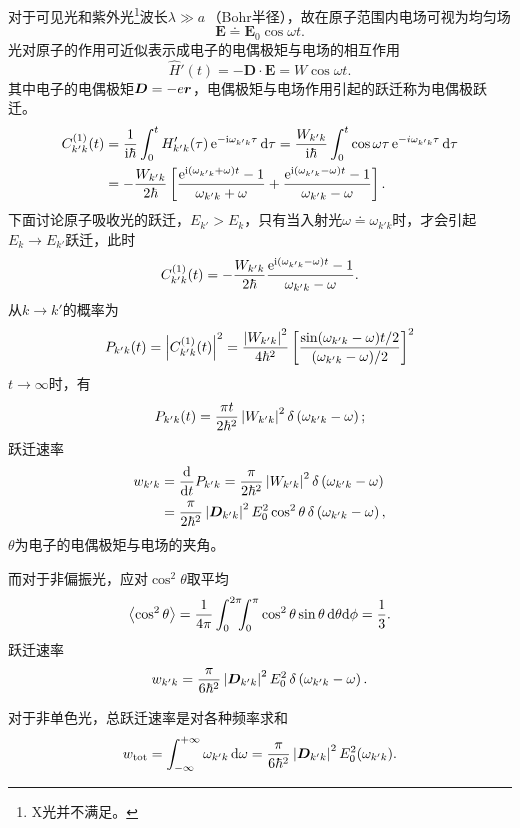 对于可见光和紫外光\footnote{X光并不满足。}波长$\lambda\gg a$\,（Bohr半径），故在原子范围内电场可视为均匀场
\[
	\bm E\doteq\bm E_0\cos\omega t.
\]
光对原子的作用可近似表示成电子的电偶极矩与电场的相互作用
\[
	\hat H'(t)=-\bm D\cdot\bm E=W\cos\omega t.
\]
其中电子的电偶极矩$\bm D=-e\r$，电偶极矩与电场作用引起的跃迁称为电偶极跃迁。
\begin{align*}
	C_{k'k}^{(1)}(t)&=\frac1{\i\hbar}\int_0^tH_{k'k}'(\tau)\e{-\i\omega_{k'k}\tau}\d\tau=\frac{W_{k'k}}{\i\hbar}\int_0^t\cos\omega\tau\e{-i\omega_{k'k}\tau}\d\tau\\
	&=-\frac{W_{k'k}}{2\hbar}\fkh{\frac{\e{\i(\omega_{k'k}+\omega)t}-1}{\omega_{k'k}+\omega}+\frac{\e{\i(\omega_{k'k}-\omega)t}-1}{\omega_{k'k}-\omega}}.
\end{align*}
下面讨论原子吸收光的跃迁，$E_{k'}>E_k$，只有当入射光$\omega\doteq\omega_{k'k}$时，才会引起$E_k\to E_{k'}$跃迁，此时
\begin{align*}
	C_{k'k}^{(1)}(t)=-\frac{W_{k'k}}{2\hbar}\frac{\e{\i(\omega_{k'k}-\omega)t}-1}{\omega_{k'k}-\omega}.
\end{align*}
从$k\to k'$的概率为
\begin{align}
	P_{k'k}(t)=\abs{C_{k'k}^{(1)}(t)}^2=\frac{\abs{W_{k'k}}^2}{4\hbar^2}\fkh{\frac{\sin(\omega_{k'k}-\omega)t/2}{(\omega_{k'k}-\omega)/2}}^2
\end{align}
$t\to\infty$时，有 
\begin{align}
	P_{k'k}(t)=\frac{\pi t}{2\hbar^2}\abs{W_{k'k}}^2\vd\kh{\omega_{k'k}-\omega};
\end{align}
跃迁速率
\begin{align}
	w_{k'k}&=\dd tP_{k'k}=\frac\pi{2\hbar^2}\abs{W_{k'k}}^2\vd\kh{\omega_{k'k}-\omega}\\
	&=\frac\pi{2\hbar^2}\abs{\bm D_{k'k}}^2E_0^2\cos^2\theta\vd\kh{\omega_{k'k}-\omega},
\end{align}
$\theta$为电子的电偶极矩与电场的夹角。

而对于非偏振光，应对$\cos^2\theta$取平均
\[
	\ave{\cos^2\theta}=\frac1{4\pi}\int_0^{2\pi}\bs5\int_0^\pi\cos^2\theta\sin\theta\d\theta\nd\phi=\frac13.
\]
跃迁速率 
\begin{align}
	w_{k'k}=\frac\pi{6\hbar^2}\abs{\bm D_{k'k}}^2E_0^2\vd\kh{\omega_{k'k}-\omega}.
\end{align}

对于非单色光，总跃迁速率是对各种频率求和
\begin{align}
	w\tot=\int\iti\omega_{k'k}\d\omega=\frac\pi{6\hbar^2}\abs{\bm D_{k'k}}^2E_0^2(\omega_{k'k}).
\end{align}

